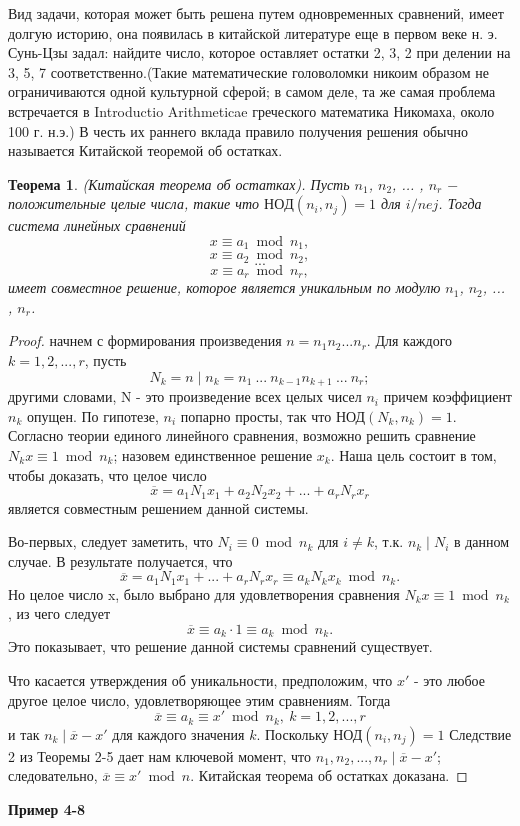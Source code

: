 \documentclass[11pt]{article}
\newtheorem{theorem}{Теорема}
\begin{document}
	Вид задачи, которая может быть решена путем одновременных сравнений, имеет долгую историю, она появилась в китайской литературе еще в первом веке н. э. Сунь-Цзы задал: найдите число, которое оставляет остатки 2, 3, 2 при делении на 3, 5, 7 соответственно.(Такие математические головоломки никоим образом не ограничиваются одной культурной сферой; в самом деле, та же самая проблема встречается в Introductio Arithmeticae греческого математика Никомаха, около 100 г. н.э.) В честь их раннего вклада правило получения решения обычно называется Китайской теоремой об остатках.
	\begin{theorem}
		(Китайская теорема об остатках). \textit{Пусть $n_{1}$, $n_{2}$, ... , $n_{r}$ $-$ положительные целые числа, такие что $НОД(n_{i}, n_{j}) = 1$ для $i /ne j$. Тогда система линейных сравнений}
			\[x\equiv a_{1}\bmod{n_{1}},\]
			\[x\equiv a_{2}\bmod{n_{2}},\]
			\[...\]
			\[x\equiv a_{r}\bmod{n_{r}},\]
		\textit{имеет совместное решение, которое является уникальным по модулю $n_{1}$, $n_{2}$, ... , $n_{r}$. } 
	\end{theorem}
	\begin{proof}
		 начнем с формирования произведения $n = n_{1}n_{2}...n_{r}$. Для каждого $k = 1,2,...,r$, пусть \[N_{k} = n\mid n_{k} = n_{1}\:...\:n_{k-1}n_{k+1}\:...\:n_{r};\] другими словами, N - это произведение всех целых чисел $n_{i}$ причем
		 коэффициент $n_{k}$ опущен. По гипотезе, $n_{i}$ попарно просты, так что  $\text{НОД}(N_{k}, n_{k}) = 1$. 
		 Согласно теории единого линейного сравнения, возможно решить сравнение $N_{k}x \equiv 1\bmod{n_{k}}$; назовем единственное решение $x_{k}$. Наша цель состоит в том, чтобы доказать, что целое число \[\overline{x} = a_{1}N_{1}x_{1} + a_{2}N_{2}x_{2} + ... + a_{r}N_{r}x_{r}\] является совместным решением данной системы.
		 
		 Во-первых, следует заметить, что $N_{i}\equiv 0\bmod{n_{k}}$ для $i \ne k$, т.к. $n_{k}\mid N_{i}$ в данном случае. В результате получается, что \[\overline{x} = a_{1}N_{1}x_{1} + ... + a_{r}N_{r}x_{r}\equiv a_{k}N_{k}x_{k}\bmod{n_{k}}.\]
		 Но целое число x, было выбрано для удовлетворения сравнения $N_{k}x \equiv 1\bmod{n_{k}}$, из чего следует \[\overline{x}\equiv a_{k}\cdot 1\equiv a_{k}\bmod{n_{k}}.\]
		 Это показывает, что решение данной системы сравнений
		 существует.
		 
		 Что касается утверждения об уникальности, предположим, что $x'$ - это любое другое
		 целое число, удовлетворяющее этим сравнениям. Тогда \[\overline{x}\equiv a_{k}\equiv x'\bmod{n_{k}},\:k = 1,2,...,r\]
		 и так $n_{k} \mid \overline{x} - x'$ для каждого значения $k$. Поскольку $\text{НОД}(n_{i},n_{j}) = 1$ Следствие 2 из Теоремы 2-5 дает нам ключевой момент, что $n_{1}, n_{2},...,n_{r} \mid \overline{x} - x'$; следовательно, $\overline{x} \equiv x'\bmod{n}$. Китайская теорема об остатках доказана.  	
	\end{proof}
	\textbf{Пример 4-8}
	
\end{document}
